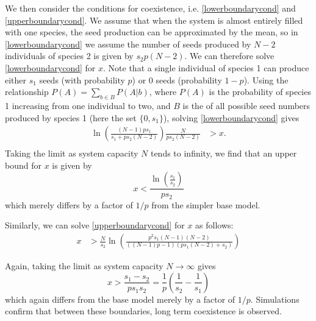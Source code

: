 We then consider the conditions for coexistence, i.e. \eqref{lowerboundarycond} and \eqref{upperboundarycond}.
We assume that when the system is almost entirely filled with one species, the seed production can be approximated by the mean, so in \eqref{lowerboundarycond} we assume the number of seeds produced by $N-2$ individuals of species 2 is given by $s_2 p (N-2)$. We can therefore solve \eqref{lowerboundarycond} for $x$. Note that a single individual of species 1 can produce either $s_1$ seeds (with probability $p$) or 0 seeds  (probability $1-p$). Using the relationship $P(A)=\sum_{b \in B}P(A|b)$, where $P(A)$ is the probability of species 1 increasing from one individual to two, and $B$ is the of all possible seed numbers produced by species 1 (here the set $\{ 0, s_1\}$), solving \eqref{lowerboundarycond} gives 
\begin{align*}
\ln \left( \frac{(N-1)ps_1}{s_1+ps_2(N-2)}\right) \frac{N}{ps_2(N-2)} &> x. \\
\end{align*}
Taking the limit as system capacity $N$ tends to infinity, we find that an upper bound for $x$ is given by
$$
x<\frac{\ln \left(\frac{s_1}{s_2}\right)}{p s_2}
$$
which merely differs by a factor of $1/p$ from the simpler base model.

Similarly, we can solve \eqref{upperboundarycond} for $x$ as follows:
\begin{align*}
 x&>\frac{N}{s_2}\ln \left( \frac{p^2 s_1(N-1)(N-2)}{((N-1)p-1)(ps_1(N-2)+s_2)} \right) \end{align*}

Again, taking the limit as system capacity $N\rightarrow \infty$ gives 
$$
x>\frac{s_1-s_2}{ps_1s_2}=\frac{1}{p}\left(\frac{1}{s_2}-\frac{1}{s_1}\right) $$
which again differs from the base model merely by a factor of $1/p$. Simulations confirm that between these boundaries, long term coexistence is observed.

